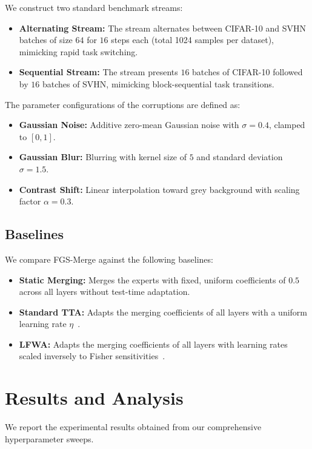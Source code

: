 \documentclass{article}
\theoremstyle{plain}
\theoremstyle{definition}
\theoremstyle{remark}
\begin{document}
We construct two standard benchmark streams:
\begin{itemize}
    \item \textbf{Alternating Stream:} The stream alternates between CIFAR-10 and SVHN batches of size $64$ for $16$ steps each (total 1024 samples per dataset), mimicking rapid task switching.
    \item \textbf{Sequential Stream:} The stream presents $16$ batches of CIFAR-10 followed by $16$ batches of SVHN, mimicking block-sequential task transitions.
\end{itemize}

The parameter configurations of the corruptions are defined as:
\begin{itemize}
    \item \textbf{Gaussian Noise:} Additive zero-mean Gaussian noise with $\sigma = 0.4$, clamped to $[0, 1]$.
    \item \textbf{Gaussian Blur:} Blurring with kernel size of $5$ and standard deviation $\sigma = 1.5$.
    \item \textbf{Contrast Shift:} Linear interpolation toward grey background with scaling factor $\alpha = 0.3$.
\end{itemize}

\subsection{Baselines}
We compare FGS-Merge against the following baselines:
\begin{itemize}
    \item \textbf{Static Merging:} Merges the experts with fixed, uniform coefficients of $0.5$ across all layers without test-time adaptation.
    \item \textbf{Standard TTA:} Adapts the merging coefficients of all layers with a uniform learning rate $\eta$~\cite{wang2021tent, yang2024adamerging}.
    \item \textbf{LFWA:} Adapts the merging coefficients of all layers with learning rates scaled inversely to Fisher sensitivities~\cite{lfwa_anon2026}.
\end{itemize}

\section{Results and Analysis}
\label{submission:results}

We report the experimental results obtained from our comprehensive hyperparameter sweeps.
\end{document}
